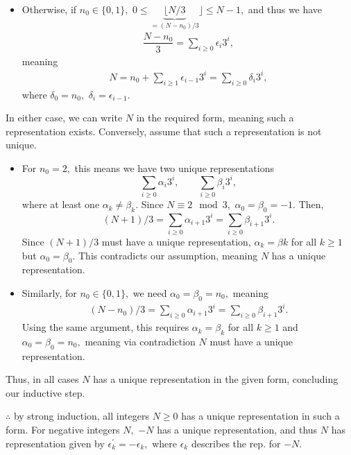 \documentclass[12pt]{article}
\begin{document}
\begin{enumerate}
\begin{itemize}
      \item Otherwise, if $n_0 \in \{0, 1\},$ $0 \leq
        \underbrace{\lfloor N/3}_{= (N - n_0)/3}\rfloor \leq N - 1,$
        and thus we have
        \begin{align*}
          \dfrac{N - n_0}{3}  = \sum_{i \geq 0}\epsilon_i 3^i,
        \end{align*}
        meaning
        \begin{align*}
          N = n_0 + \sum_{i \geq 1}\epsilon_{i - 1}3^i = \sum_{i \geq
          0} \delta _i 3^i,
        \end{align*}
        where $\delta_0 = n_0,$ $\delta_i = \epsilon_{i -1 }.$
    \end{itemize}

    In either case, we can write $N$ in the required form, meaning
    such a representation exists. Conversely, assume that such a
    representation is not unique.
    \begin{itemize}
      \item For $n_0 = 2,$ this means we have two unique representations
        $$
        \sum_{i \geq 0} \alpha_i 3^i, \qquad \sum_{i \geq 0} \beta_i 3^i,
        $$
        where at least one $\alpha_k \neq \beta_k.$ Since $N \equiv 2
        \mod 3,$ $\alpha_0 = \beta_0 = -1.$ Then,
        $$
        (N + 1)/3 = \sum_{i \geq 0} \alpha_{i + 1} 3^{i} = \sum_{i
        \geq 0} \beta_{i + 1}3^{i}.
        $$
        Since $(N + 1)/ 3$ must have a unique representation,
        $\alpha_{k} = \beta{k}$ for all $k \geq 1$ but $\alpha_0 =
        \beta_0.$ This contradicts our assumption, meaning $N$ has a
        unique representation.

      \item Similarly, for $n_0 \in \{0, 1\},$ we need $\alpha_0  =
        \beta_0 = n_0,$ meaning
        \begin{align*}
          (N - n_0 )/ 3 = \sum_{i \geq 0} \alpha_{i+ 1} 3^{i} =
          \sum_{i \geq 0} \beta_{i + 1} 3^i.
        \end{align*}
        Using the same argument, this requires $\alpha_k = \beta_k$
        for all $k \geq 1$ and $\alpha_0 = \beta_0 = n_0,$ meaning
        via contradiction $N$ must have a unique representation.
    \end{itemize}

    Thus, in all cases $N$ has a unique representation in the given
    form, concluding our inductive step.

    $\therefore$ by strong induction, all integers $N \geq 0$ has a
    unique representation in such a form. For negative integers $N,$
    $-N$ has a unique representation, and thus $N$ has representation
    given by $\epsilon_k^{'} = -\epsilon_k,$ where $\epsilon_k$
    describes the rep. for $-N.$


\end{enumerate}
\end{document}
